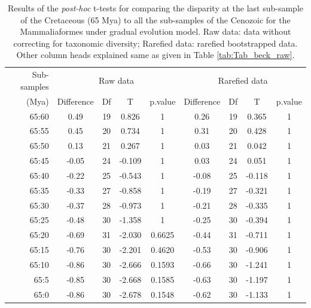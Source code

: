 \documentclass[12pt,letterpaper]{article}
\begin{document}
\begin{table}[ht]
\caption{Results of the \textit{post-hoc} t-tests for comparing the disparity at the last sub-sample of the Cretaceous (65 Mya) to all the sub-samples of the Cenozoic for the Mammaliaformes \citep[data from][]{Slater2012MEE} under gradual evolution model. Raw data: data without correcting for taxonomic diversity; Rarefied data: rarefied bootstrapped data. Other column heads explained same as given in Table \ref{tab:Tab_beck_raw}.}
\label{tab:Tab_slater}
\centering
\begin{tabular}{r|cccc|cccc}
  \hline
  Sub-samples & \multicolumn{4}{c|}{Raw data} & \multicolumn{4}{c}{Rarefied data} \\
  (Mya) & Difference & Df & T & p.value & Difference & Df & T & p.value \\ 
  \hline
  65:60 & 0.49  & 19 & 0.826  & 1      & 0.26  & 19 & 0.365  & 1 \\ 
  65:55 & 0.45  & 20 & 0.734  & 1      & 0.31  & 20 & 0.428  & 1 \\ 
  65:50 & 0.13  & 21 & 0.267  & 1      & 0.03  & 21 & 0.042  & 1 \\ 
  65:45 & -0.05 & 24 & -0.109 & 1      & 0.03  & 24 & 0.051  & 1 \\ 
  65:40 & -0.22 & 25 & -0.543 & 1      & -0.08 & 25 & -0.118 & 1 \\ 
  65:35 & -0.33 & 27 & -0.858 & 1      & -0.19 & 27 & -0.321 & 1 \\ 
  65:30 & -0.37 & 28 & -0.973 & 1      & -0.21 & 28 & -0.335 & 1 \\ 
  65:25 & -0.48 & 30 & -1.358 & 1      & -0.25 & 30 & -0.394 & 1 \\ 
  65:20 & -0.69 & 31 & -2.030 & 0.6625 & -0.44 & 31 & -0.711 & 1 \\ 
  65:15 & -0.76 & 30 & -2.201 & 0.4620 & -0.53 & 30 & -0.906 & 1 \\ 
  65:10 & -0.86 & 30 & -2.666 & 0.1593 & -0.66 & 30 & -1.241 & 1 \\ 
  65:5  & -0.85 & 30 & -2.668 & 0.1585 & -0.63 & 30 & -1.197 & 1 \\ 
  65:0  & -0.86 & 30 & -2.678 & 0.1548 & -0.62 & 30 & -1.133 & 1 \\ 
   \hline
\end{tabular}
\end{table}

%
%
\end{document}

